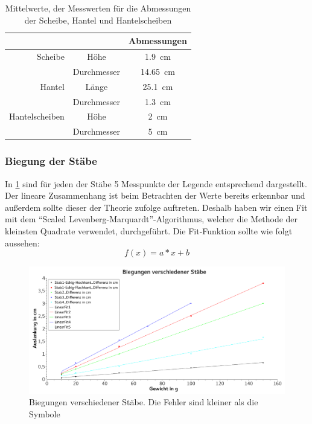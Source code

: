 \documentclass[
	a4paper,
	12pt,
	pagesize,
	ngerman
]{scrartcl}
\begin{document}
	
	\begin{table}[H]
		\centering
		\begin{tabular}{ r | c | c |} 
			& & Abmessungen\\ \hline
			Scheibe & Höhe & \SI{1,9}{\centi \meter }\\
			& Durchmesser & \SI{14,65}{\centi \meter }\\ \hline
			Hantel & Länge & \SI{25,1}{\centi \meter }\\
			& Durchmesser & \SI{1,3}{\centi \meter }\\ \hline
			Hantelscheiben & Höhe & \SI{2}{\centi \meter } \\
			& Durchmesser & \SI{5}{\centi \meter }\\ \hline
		\end{tabular}
		\caption{Mittelwerte, der Messwerten für die Abmessungen der Scheibe, Hantel und Hantelscheiben}
		\label{Abmessungen_Scheiben}
	\end{table}
	\subsubsection{Biegung der Stäbe}
	In \cref{BiegungGraph} sind für jeden der Stäbe 5 Messpunkte der Legende entsprechend dargestellt. Der lineare Zusammenhang ist beim Betrachten der Werte bereits erkennbar und außerdem sollte dieser der Theorie zufolge auftreten. Deshalb haben wir einen Fit mit dem \enquote{Scaled Levenberg-Marquardt}-Algorithmus, welcher die Methode der kleinsten Quadrate verwendet, durchgeführt. Die Fit-Funktion sollte wie folgt aussehen:
	\begin{equation}
		f(x)=a*x+b
	\end{equation}
	\begin{figure}[H]
		\includegraphics[width=1\textwidth]{Biegungen}
		\centering
		\caption{Biegungen verschiedener Stäbe. Die Fehler sind kleiner als die Symbole}
		\label{BiegungGraph}
		\centering
	\end{figure}
\end{document}
